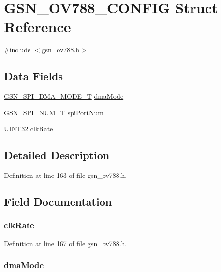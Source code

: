 \hypertarget{a00178}{
\section{GSN\_\-OV788\_\-CONFIG Struct Reference}
\label{a00178}
}


{\ttfamily \#include $<$gsn\_\-ov788.h$>$}

\subsection*{Data Fields}
\begin{DoxyCompactItemize}
\item 
\hyperlink{a00655_gafff743b26bbfafb380a9797457935a0e}{GSN\_\-SPI\_\-DMA\_\-MODE\_\-T} \hyperlink{a00178_a8745e343cad523631d63304871d0bdf3}{dmaMode}
\item 
\hyperlink{a00587_a8158d263babcdfe1b3b113e23acd1bf7}{GSN\_\-SPI\_\-NUM\_\-T} \hyperlink{a00178_a66613b992321b76dd7fe06a04ba37a58}{spiPortNum}
\item 
\hyperlink{a00660_gae1e6edbbc26d6fbc71a90190d0266018}{UINT32} \hyperlink{a00178_a8ecdd62c1d4627c282ee0e7bc80ae679}{clkRate}
\end{DoxyCompactItemize}


\subsection{Detailed Description}


Definition at line 163 of file gsn\_\-ov788.h.



\subsection{Field Documentation}
\hypertarget{a00178_a8ecdd62c1d4627c282ee0e7bc80ae679}{
\subsubsection[{clkRate}]{ {\bf clkRate}}}
\label{a00178_a8ecdd62c1d4627c282ee0e7bc80ae679}


Definition at line 167 of file gsn\_\-ov788.h.

\hypertarget{a00178_a8745e343cad523631d63304871d0bdf3}{
\subsubsection[{dmaMode}]{ {\bf dmaMode}}}
\label{a00178_a8745e343cad523631d63304871d0bdf3}


